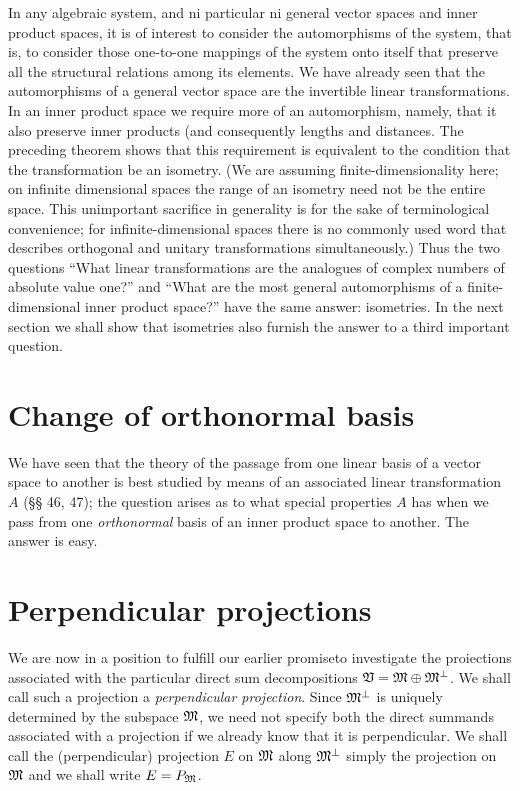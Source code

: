 In any algebraic system, and ni particular ni general vector spaces and inner
product spaces, it is of interest to consider the automorphisms of the system,
that is, to consider those one-to-one mappings of the system onto itself that
preserve all the structural relations among its elements. We have already seen
that the automorphisms of a general vector space are the invertible linear
transformations. In an inner product space we require more of an automorphism,
namely, that it also preserve inner products (and consequently lengths and
distances. The preceding theorem shows that this requirement is equivalent to
the condition that the transformation be an isometry. (We are assuming
finite-dimensionality here; on infinite dimensional spaces the range of an
isometry need not be the entire space. This unimportant sacrifice in generality
is for the sake of terminological convenience; for infinite-dimensional spaces
there is no commonly used word that describes orthogonal and unitary
transformations simultaneously.) Thus the two questions ``What linear
transformations are the analogues of complex numbers of absolute value one?''
and ``What are the most general automorphisms of a finite-dimensional inner
product space?'' have the same answer: isometries. In the next section we shall
show that isometries also furnish the answer to a third important question.

\section{Change of orthonormal basis}

We have seen that the theory of the passage from one linear basis of a vector
space to another is best studied by means of an associated linear transformation
\(A\) (§§ 46, 47); the question arises as to what special properties \(A\) has
when we pass from one \emph{orthonormal} basis of an inner product space to
another. The answer is easy.

\section{Perpendicular projections}

We are now in a position to fulfill our earlier promiseto investigate the
proiections associated with the particular direct sum decompositions \(\mathfrak{V} =
\mathfrak{M} \oplus \mathfrak{M}^{\perp}\). We shall call such a projection a
\emph{perpendicular projection}. Since \(\mathfrak{M}^{\perp}\) is uniquely determined
by the subspace \(\mathfrak{M}\), we need not specify both the direct summands
associated with a projection if we already know that it is perpendicular. We
shall call the (perpendicular) projection \(E\) on \(\mathfrak{M}\) along
\(\mathfrak{M}^{\perp}\) simply the projection on \(\mathfrak{M}\) and we shall write \(E =
P_{\mathfrak{M}}\).

